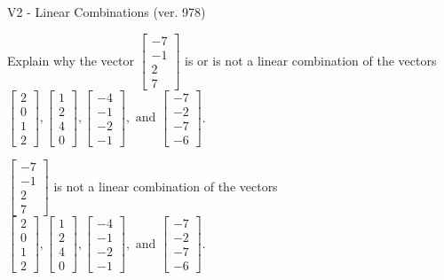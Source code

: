 \begin{exercise}
  \begin{exerciseTitle}V2 - Linear Combinations (ver. 978)\end{exerciseTitle}
  \begin{exerciseStatement}
    Explain why the vector \(\left[\begin{array}{c}
-7 \\
-1 \\
2 \\
7
\end{array}\right]\)  is or is not a linear 
	combination of the vectors \(\left[\begin{array}{c}
2 \\
0 \\
1 \\
2
\end{array}\right] , \left[\begin{array}{c}
1 \\
2 \\
4 \\
0
\end{array}\right] , \left[\begin{array}{c}
-4 \\
-1 \\
-2 \\
-1
\end{array}\right] , \text{ and } \left[\begin{array}{c}
-7 \\
-2 \\
-7 \\
-6
\end{array}\right]\).
	


  \end{exerciseStatement}
  \begin{exerciseAnswer}
   \(\left[\begin{array}{c}
-7 \\
-1 \\
2 \\
7
\end{array}\right]\) 
  	 is not  
	a linear combination of the vectors \(\left[\begin{array}{c}
2 \\
0 \\
1 \\
2
\end{array}\right] , \left[\begin{array}{c}
1 \\
2 \\
4 \\
0
\end{array}\right] , \left[\begin{array}{c}
-4 \\
-1 \\
-2 \\
-1
\end{array}\right] , \text{ and } \left[\begin{array}{c}
-7 \\
-2 \\
-7 \\
-6
\end{array}\right]\).


\end{exerciseAnswer}
\end{exercise}
